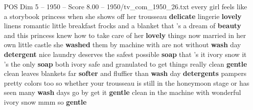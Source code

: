 \begin{textsample}{POS Dim 5 – 1950 – Score 8.00 – 1950/tv\_com\_1950\_26.txt}  \label{ex:f5_pos_041}
every girl feels like a storybook princess when she shows off her trousseau \textbf{delicate} lingerie \textbf{lovely} linens romantic little breakfast frocks and a blanket that 's a dream of \textbf{beauty} and this princess knew how to take care of her \textbf{lovely} things now married in her own little castle she \textbf{washed} them by machine with are not without \textbf{wash} day \textbf{detergent} nice laundry deserves the safest possible \textbf{soap} that 's it ivory snow it 's the only \textbf{soap} both ivory safe and granulated to get things really clean \textbf{gentle} clean leaves blankets far \textbf{softer} and fluffier than \textbf{wash} day \textbf{detergents} pampers pretty colors too so whether your trousseau is still in the honeymoon stage or has seen many \textbf{wash} days go by get it \textbf{gentle} clean in the machine with wonderful ivory snow mmm so \textbf{gentle}

\end{textsample}
